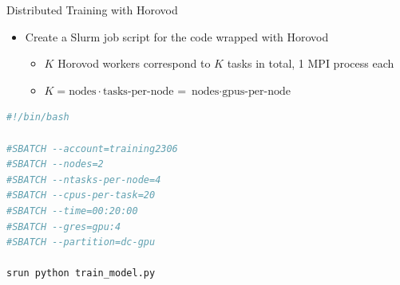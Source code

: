 \begin{frame}[fragile]{Distributed Training with Horovod}
\protect\hypertarget{distributed-training-with-horovod-5}{}

\begin{itemize}
\tightlist
\item
  Create a Slurm job script for the code wrapped with Horovod

  \begin{itemize}
  \tightlist
  \item
    \(K\) Horovod workers correspond to \(K\) tasks in total, 1 MPI
    process each
  \item
    \(K = \text{nodes} \cdot \text{tasks-per-node}\) =
    \(\text{nodes} \cdot \text{gpus-per-node}\)
  \end{itemize}
\end{itemize}

\begin{lstlisting}[language=bash]
#!/bin/bash

#SBATCH --account=training2306
#SBATCH --nodes=2
#SBATCH --ntasks-per-node=4
#SBATCH --cpus-per-task=20
#SBATCH --time=00:20:00
#SBATCH --gres=gpu:4
#SBATCH --partition=dc-gpu

srun python train_model.py
\end{lstlisting}


\end{frame}


